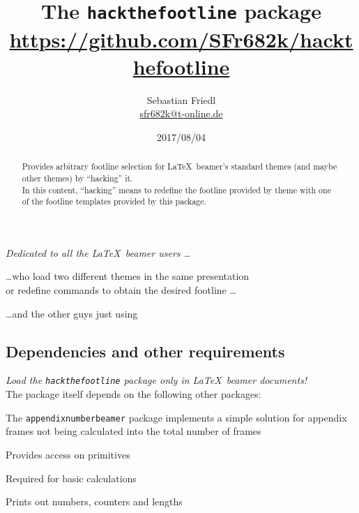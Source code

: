 \documentclass[11pt]{ltxdoc}
\title{The \texttt{\bfseries hackthefootline} package \\ {\large\url{https://github.com/SFr682k/hackthefootline}}}
\author{Sebastian Friedl \\ \href{mailto:sfr682k@t-online.de}{\ttfamily sfr682k@t-online.de}}
\date{2017/08/04}
\begin{document}
	\maketitle
	\thispagestyle{empty}
	
	\begin{center} \itshape
		Dedicated to all the \LaTeX\ beamer users \dots
		
		\medskip
		\dots who load two different themes in the same presentation \\ or redefine commands to obtain the desired footline \dots
		
		\medskip
		\dots and the other guys just using \texttt{}
	\end{center}
	
	\medskip
	\begin{abstract}
		\hspace{-1.5em}%
		Provides arbitrary footline selection for \LaTeX\ beamer's standard themes (and maybe other themes) by \enquote{hacking} it. \\
		In this content, \enquote{hacking} means to redefine the footline provided by theme with one of the footline templates provided by this package.
	\end{abstract}
	
	
	\tableofcontents
	
	\clearpage
	


	\subsection*{Dependencies and other requirements}
	\emph{Load the \texttt{hackthefootline} package only in \LaTeX\ beamer documents!} \\
	The package itself depends on the following other packages:
	
	\medskip
	The \texttt{appendixnumberbeamer} package implements a simple solution for appendix frames not being calculated into the total number of frames
	
	\medskip
	Provides access on  primitives
	
	\medskip
	Required for basic calculations

	\medskip
	Prints out numbers, counters and lengths
	
\end{document}
